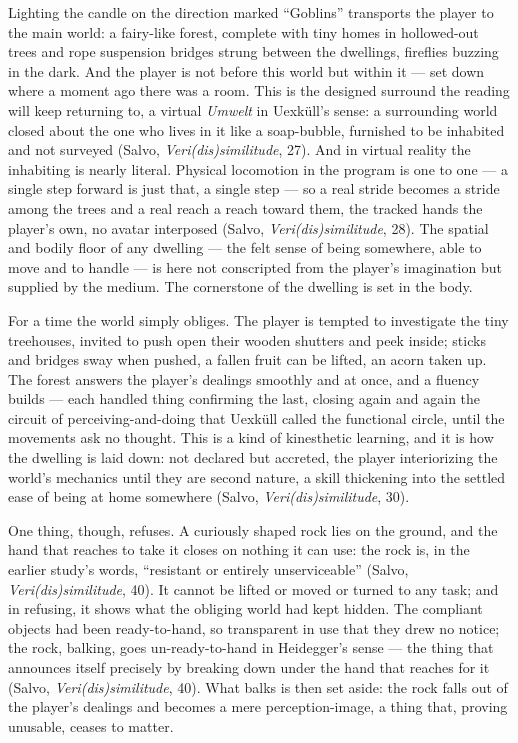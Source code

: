 \documentclass{article}
\begin{document}
Lighting the candle on the direction marked ``Goblins'' transports the player to the main world: a fairy-like forest, complete with tiny homes in hollowed-out trees and rope suspension bridges strung between the dwellings, fireflies buzzing in the dark. And the player is not before this world but within it — set down where a moment ago there was a room. This is the designed surround the reading will keep returning to, a virtual \textit{Umwelt} in Uexküll's sense: a surrounding world closed about the one who lives in it like a soap-bubble, furnished to be inhabited and not surveyed (Salvo, \textit{Veri(dis)similitude}, 27). And in virtual reality the inhabiting is nearly literal. Physical locomotion in the program is one to one — a single step forward is just that, a single step — so a real stride becomes a stride among the trees and a real reach a reach toward them, the tracked hands the player's own, no avatar interposed (Salvo, \textit{Veri(dis)similitude}, 28). The spatial and bodily floor of any dwelling — the felt sense of being somewhere, able to move and to handle — is here not conscripted from the player's imagination but supplied by the medium. The cornerstone of the dwelling is set in the body.

For a time the world simply obliges. The player is tempted to investigate the tiny treehouses, invited to push open their wooden shutters and peek inside; sticks and bridges sway when pushed, a fallen fruit can be lifted, an acorn taken up. The forest answers the player's dealings smoothly and at once, and a fluency builds — each handled thing confirming the last, closing again and again the circuit of perceiving-and-doing that Uexküll called the functional circle, until the movements ask no thought. This is a kind of kinesthetic learning, and it is how the dwelling is laid down: not declared but accreted, the player interiorizing the world's mechanics until they are second nature, a skill thickening into the settled ease of being at home somewhere (Salvo, \textit{Veri(dis)similitude}, 30).

One thing, though, refuses. A curiously shaped rock lies on the ground, and the hand that reaches to take it closes on nothing it can use: the rock is, in the earlier study's words, ``resistant or entirely unserviceable'' (Salvo, \textit{Veri(dis)similitude}, 40). It cannot be lifted or moved or turned to any task; and in refusing, it shows what the obliging world had kept hidden. The compliant objects had been ready-to-hand, so transparent in use that they drew no notice; the rock, balking, goes un-ready-to-hand in Heidegger's sense — the thing that announces itself precisely by breaking down under the hand that reaches for it (Salvo, \textit{Veri(dis)similitude}, 40). What balks is then set aside: the rock falls out of the player's dealings and becomes a mere perception-image, a thing that, proving unusable, ceases to matter.
\end{document}
